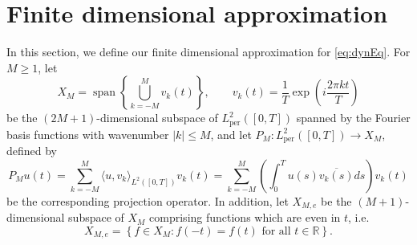 \documentclass[12pt,reqno]{amsart}
\def\R{{\mathbb R}}
\def\C{{\mathbb C}}
\def\Z{{\mathbb Z}}
\def\per{\textrm{per}}
\DeclareMathOperator{\spn}{span}
\newtheorem{lemma}{Lemma}
\theoremstyle{definition}
\begin{document}

\section{Finite dimensional approximation}

In this section, we define our finite dimensional approximation for \cref{eq:dynEq}. For $M \geq 1$, let 
\begin{equation}\label{eq:XM}
X_M = \spn\left\{ \bigcup_{k = -M}^M v_k(t) \right\}, \qquad
v_k(t) = \frac{1}{T} \exp\left( i \frac{2 \pi k t}{T} \right)
\end{equation}
be the $(2M+1)$-dimensional subspace of $L_\per^2([0,T])$ spanned by the Fourier basis functions with wavenumber $|k| \leq M$, and let $P_M: L_\per^2([0,T]) \rightarrow X_M$, defined by
\begin{equation}\label{eq:PM}
P_M u(t) = \sum_{k=-M}^M \langle u, v_k \rangle_{L^2([0,T])} v_k(t)
= \sum_{k=-M}^M \left( \int_0^T u(s) \overline{v_k(s)} ds \right) v_k(t)
\end{equation}
be the corresponding projection operator. In addition, let $X_{M,e}$ be the $(M+1)$-dimensional subspace of $X_M$ comprising functions which are even in $t$, i.e.
\begin{equation}
X_{M,e} = \left\{ f \in X_M : f(-t) = f(t) \text{ for all }t \in \R \right\}.
\end{equation}
\end{document}
